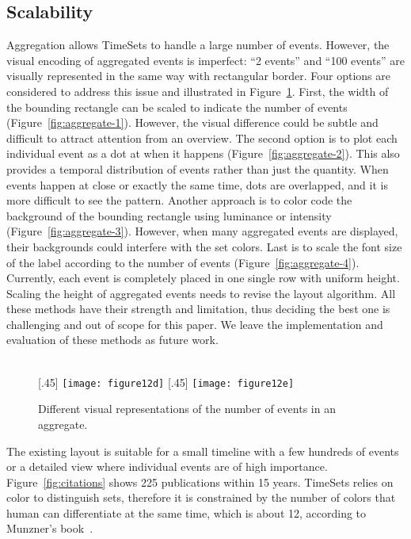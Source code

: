 \subsection{Scalability}
Aggregation allows TimeSets to handle a large number of events. However, the visual encoding of aggregated events is imperfect: ``2 events'' and ``100 events'' are visually represented in the same way with rectangular border. Four options are considered to address this issue and illustrated in Figure~\ref{fig:aggreate}. First, the width of the bounding rectangle can be scaled to indicate the number of events (Figure~\ref{fig:aggregate-1}). However, the visual difference could be subtle and difficult to attract attention from an overview. The second option is to plot each individual event as a dot at when it happens (Figure~\ref{fig:aggregate-2}). This also provides a temporal distribution of events rather than just the quantity. When events happen at close or exactly the same time, dots are overlapped, and it is more difficult to see the pattern. Another approach is to color code the background of the bounding rectangle using luminance or intensity (Figure~\ref{fig:aggregate-3}). However, when many aggregated events are displayed, their backgrounds could interfere with the set colors. Last is to scale the font size of the label according to the number of events (Figure~\ref{fig:aggregate-4}). Currently, each event is completely placed in one single row with uniform height. Scaling the height of aggregated events needs to revise the layout algorithm.	All these methods have their strength and limitation, thus deciding the best one is challenging and out of scope for this paper. We leave the implementation and evaluation of these methods as future work.

\begin{figure}[ht]
	\centering
	\hfill
	\hfill
	\\
	[.45\columnwidth]{\label{fig:aggregate-3}
		\texttt{[image: figure12d]}}
	\hfill
	[.45\columnwidth]{\label{fig:aggregate-4}
		\texttt{[image: figure12e]}}
	\caption{Different visual representations of the number of events in an aggregate.}
	\label{fig:aggreate}
\end{figure}

The existing layout is suitable for a small timeline with a few hundreds of events or a detailed view where individual events are of high importance. Figure~\ref{fig:citations} shows 225 publications within 15 years. TimeSets relies on color to distinguish sets, therefore it is constrained by the number of colors that human can differentiate at the same time, which is about 12, according to Munzner's book~\cite{Munzner2014}.